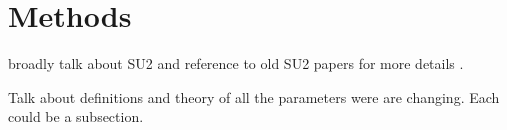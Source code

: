 
\section{Methods}
broadly talk about SU2 and reference to old SU2 papers for more details \cite{Palacios2014}.

Talk about definitions and theory of all the parameters were are changing. Each could be a subsection.

